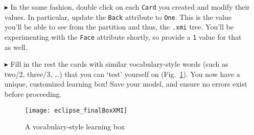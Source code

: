 \begin{itemize}
\item[$\blacktriangleright$] In the same fashion, double click on each \texttt{Card} you created and modify their values. In particular, update the
\texttt{Back} attribute to \texttt{One}. This is the value you'll be able to see from the partition and thus, the \texttt{.xmi} tree. You'll be experimenting
with the \texttt{Face} attribute shortly, so provide a \texttt{1} value for that as well.

\item[$\blacktriangleright$] Fill in the rest the cards with similar vocabulary-style words (such as two/2, three/3, \ldots) that you can `test' yourself on
(Fig.~\ref{fig:finalXMI}). You now have a unique, customized learning box! Save your model, and ensure no errors exist before proceeding.

\begin{figure}[htbp]
	\centering
  \texttt{[image: eclipse\_finalBoxXMI]}
	\caption{A vocabulary-style learning box}
	\label{fig:finalXMI}
\end{figure}

\end{itemize}
